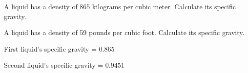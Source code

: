

A liquid has a density of 865 kilograms per cubic meter.  Calculate its specific gravity.

\vskip 10pt

A liquid has a density of 59 pounds per cubic foot.  Calculate its specific gravity.

\vskip 10pt







First liquid's specific gravity = 0.865

\vskip 10pt

Second liquid's specific gravity = 0.9451











